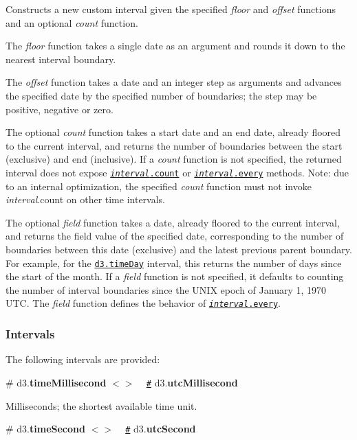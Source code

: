 Constructs a new custom interval given the specified {\itshape floor} and {\itshape offset} functions and an optional {\itshape count} function.

The {\itshape floor} function takes a single date as an argument and rounds it down to the nearest interval boundary.

The {\itshape offset} function takes a date and an integer step as arguments and advances the specified date by the specified number of boundaries; the step may be positive, negative or zero.

The optional {\itshape count} function takes a start date and an end date, already floored to the current interval, and returns the number of boundaries between the start (exclusive) and end (inclusive). If a {\itshape count} function is not specified, the returned interval does not expose \href{#interval_count}{\tt {\itshape interval}.count} or \href{#interval_every}{\tt {\itshape interval}.every} methods. Note\+: due to an internal optimization, the specified {\itshape count} function must not invoke {\itshape interval}.count on other time intervals.

The optional {\itshape field} function takes a date, already floored to the current interval, and returns the field value of the specified date, corresponding to the number of boundaries between this date (exclusive) and the latest previous parent boundary. For example, for the \href{#timeDay}{\tt d3.\+time\+Day} interval, this returns the number of days since the start of the month. If a {\itshape field} function is not specified, it defaults to counting the number of interval boundaries since the U\+N\+IX epoch of January 1, 1970 U\+TC. The {\itshape field} function defines the behavior of \href{#interval_every}{\tt {\itshape interval}.every}.

\subsubsection*{Intervals}

The following intervals are provided\+:

\label{_timeMillisecond}%
\# d3.{\bfseries time\+Millisecond} \href{https://github.com/d3/d3-time/blob/master/src/millisecond.js}{\tt $<$$>$} ~\newline
\href{#timeMillisecond}{\tt \#} d3.{\bfseries utc\+Millisecond}

Milliseconds; the shortest available time unit.

\label{_timeSecond}%
\# d3.{\bfseries time\+Second} \href{https://github.com/d3/d3-time/blob/master/src/second.js}{\tt $<$$>$} ~\newline
\href{#timeSecond}{\tt \#} d3.{\bfseries utc\+Second}

